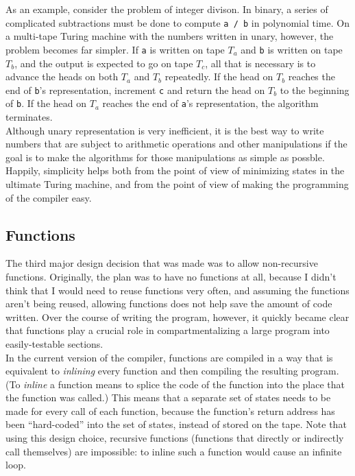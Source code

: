\documentclass{report}
\begin{document}
As an example, consider the problem of integer divison. In binary, a series of complicated subtractions must be done to compute \texttt{a / b} in polynomial time. On a multi-tape Turing machine with the numbers written in unary, however, the problem becomes far simpler. If \texttt{a} is written on tape $T_a$ and \texttt{b} is written on tape $T_b$, and the output is expected to go on tape $T_c$, all that is necessary is to advance the heads on both $T_a$ and $T_b$ repeatedly. If the head on $T_b$ reaches the end of \texttt{b}'s representation, increment \texttt{c} and return the head on $T_b$ to the beginning of \texttt{b}. If the head on $T_a$ reaches the end of \texttt{a}'s representation, the algorithm terminates. \\

Although unary representation is very inefficient, it is the best way to write numbers that are subject to arithmetic operations and other manipulations if the goal is to make the algorithms for those manipulations as simple as possble. Happily, simplicity helps both from the point of view of minimizing states in the ultimate Turing machine, and from the point of view of making the programming of the compiler easy. \\

\subsection{Functions \label{sec:functions}}

The third major design decision that was made was to allow non-recursive functions. Originally, the plan was to have no functions at all, because I didn't think that I would need to reuse functions very often, and assuming the functions aren't being reused, allowing functions does not help save the amount of code written. Over the course of writing the program, however, it quickly became clear that functions play a crucial role in compartmentalizing a large program into easily-testable sections. \\ 

In the current version of the compiler, functions are compiled in a way that is equivalent to \emph{inlining} every function and then compiling the resulting program. (To \emph{inline} a function means to splice the code of the function into the place that the function was called.) This means that a separate set of states needs to be made for every call of each function, because the function's return address has been ``hard-coded'' into the set of states, instead of stored on the tape. Note that using this design choice, recursive functions (functions that directly or indirectly call themselves) are impossible: to inline such a function would cause an infinite loop. \\
\end{document}
